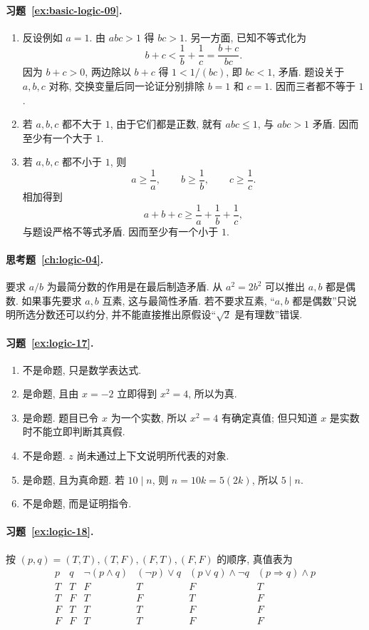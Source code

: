 \documentclass[usesamecnt, thmcnt=section, lang=cn, newtx, 10pt, scheme=chinese]{elegantbook}
\begin{document}
\paragraph*{习题~\ref{ex:basic-logic-09}.}
\begin{enumerate}[label=\rm(\arabic*)]
  \item 反设例如 $a=1$. 由 $abc>1$ 得 $bc>1$. 另一方面, 已知不等式化为
  \[
    b+c<\frac1b+\frac1c=\frac{b+c}{bc}.
  \]
  因为 $b+c>0$, 两边除以 $b+c$ 得 $1<1/(bc)$, 即 $bc<1$, 矛盾. 题设关于 $a,b,c$ 对称, 交换变量后同一论证分别排除 $b=1$ 和 $c=1$. 因而三者都不等于 $1$.
  \item 若 $a,b,c$ 都不大于 $1$, 由于它们都是正数, 就有 $abc\leq1$, 与 $abc>1$ 矛盾. 因而至少有一个大于 $1$.
  \item 若 $a,b,c$ 都不小于 $1$, 则
  \[
    a\geq\frac1a,\qquad b\geq\frac1b,\qquad c\geq\frac1c.
  \]
  相加得到
  \[
    a+b+c\geq\frac1a+\frac1b+\frac1c,
  \]
  与题设严格不等式矛盾. 因而至少有一个小于 $1$.
\end{enumerate}

\paragraph*{思考题~\ref{ch:logic-04}.}
要求 $a/b$ 为最简分数的作用是在最后制造矛盾. 从 $a^2=2b^2$ 可以推出 $a,b$ 都是偶数. 如果事先要求 $a,b$ 互素, 这与最简性矛盾. 若不要求互素, ``$a,b$ 都是偶数''只说明所选分数还可以约分, 并不能直接推出原假设``$\sqrt2$ 是有理数''错误.

\paragraph*{习题~\ref{ex:logic-17}.}
\begin{enumerate}[label=\rm(\arabic*)]
  \item 不是命题, 只是数学表达式.
  \item 是命题, 且由 $x=-2$ 立即得到 $x^2=4$, 所以为真.
  \item 是命题. 题目已令 $x$ 为一个实数, 所以 $x^2=4$ 有确定真值; 但只知道 $x$ 是实数时不能立即判断其真假.
  \item 不是命题. $z$ 尚未通过上下文说明所代表的对象.
  \item 是命题, 且为真命题. 若 $10\mid n$, 则 $n=10k=5(2k)$, 所以 $5\mid n$.
  \item 不是命题, 而是证明指令.
\end{enumerate}

\paragraph*{习题~\ref{ex:logic-18}.}
按 $(p,q)=(T,T),(T,F),(F,T),(F,F)$ 的顺序, 真值表为
\[
\begin{array}{c|c|c|c|c|c}
 p&q&\neg(p\wedge q)&(\neg p)\vee q&(p\vee q)\wedge\neg q&(p\Rightarrow q)\wedge p\\
 \hline
 T&T&F&T&F&T\\
 T&F&T&F&T&F\\
 F&T&T&T&F&F\\
 F&F&T&T&F&F
\end{array}
\]
\end{document}
